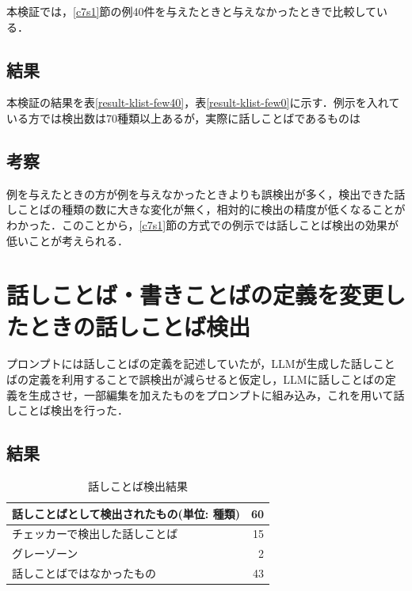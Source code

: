 本検証では，\ref{c7s1}節の例40件を与えたときと与えなかったときで比較している．

\subsection{結果}
本検証の結果を表\ref{result-klist-few40}，表\ref{result-klist-few0}に示す．例示を入れている方では検出数は70種類以上あるが，実際に話しことばであるものは



\subsection{考察}
例を与えたときの方が例を与えなかったときよりも誤検出が多く，検出できた話しことばの種類の数に大きな変化が無く，相対的に検出の精度が低くなることがわかった．このことから，\ref{c7s1}節の方式での例示では話しことば検出の効果が低いことが考えられる．

\section{話しことば・書きことばの定義を変更したときの話しことば検出 \label{c7s3}}
プロンプトには話しことばの定義を記述していたが，LLMが生成した話しことばの定義を利用することで誤検出が減らせると仮定し，LLMに話しことばの定義を生成させ，一部編集を加えたものをプロンプトに組み込み，これを用いて話しことば検出を行った．



\subsection{結果}

\begin{table}[H]
\centering
\caption{話しことば検出結果}
\label{result-expert}
\begin{tabular}{|l|r|}
\hline
話しことばとして検出されたもの(単位: 種類) & 60 \\ \hline
チェッカーで検出した話しことば & 15 \\ \hline
グレーゾーン & 2 \\ \hline
話しことばではなかったもの & 43 \\ \hline
\end{tabular}
\end{table} %

